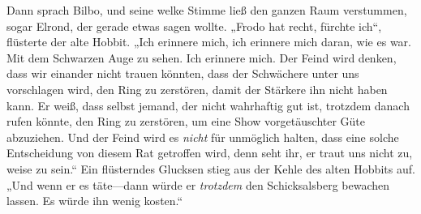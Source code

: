 Dann sprach Bilbo, und seine welke Stimme ließ den ganzen Raum verstummen, sogar Elrond, der gerade etwas sagen wollte. „Frodo hat recht, fürchte ich“, flüsterte der alte Hobbit. „Ich erinnere mich, ich erinnere mich daran, wie es war. Mit dem Schwarzen Auge zu sehen. Ich erinnere mich. Der Feind wird denken, dass wir einander nicht trauen könnten, dass der Schwächere unter uns vorschlagen wird, den Ring zu zerstören, damit der Stärkere ihn nicht haben kann. Er weiß, dass selbst jemand, der nicht wahrhaftig gut ist, trotzdem danach rufen könnte, den Ring zu zerstören, um eine Show vorgetäuschter Güte abzuziehen. Und der Feind wird es \emph{nicht} für unmöglich halten, dass eine solche Entscheidung von diesem Rat getroffen wird, denn seht ihr, er traut uns nicht zu, weise zu sein.“ Ein flüsterndes Glucksen stieg aus der Kehle des alten Hobbits auf. „Und wenn er es täte—dann würde er \emph{trotzdem} den Schicksalsberg bewachen lassen. Es würde ihn wenig kosten.“

